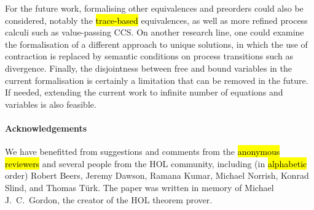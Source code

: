 For the future work, formalising other equivalences and preorders could also be considered,
notably the \hl{trace-based} equivalences, as well as more refined process
calculi such as value-passing CCS.
%
On another research line, one could examine the formalisation of a different
approach \cite{DurierHS17} to unique
solutions, in which the use of contraction is
replaced by semantic conditions on process transitions such as
divergence.
%
Finally, the disjointness between free and bound variables in the current
\multivariate formalisation is certainly a limitation that can be
removed in the future. If needed, extending the current work to
infinite number of equations and variables is also feasible.


\paragraph{Acknowledgements}

We have  benefitted from suggestions and comments 
from  the \hl{anonymous reviewers} and several people from the HOL
community, including (in \hl{alphabetic} order) Robert Beers, Jeremy Dawson,
Ramana Kumar,
Michael Norrish, 
Konrad Slind, and
Thomas T\"{u}rk.
%
The paper was written in memory of Michael J.~C.~Gordon, the creator of the HOL theorem prover.
